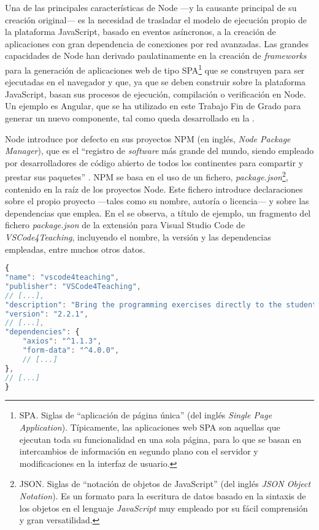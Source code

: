 Una de las principales características de Node ---y la causante principal de su creación original--- es la necesidad de trasladar el modelo de ejecución propio de la plataforma JavaScript, basado en eventos asíncronos, a la creación de aplicaciones con gran dependencia de conexiones por red avanzadas. Las grandes capacidades de Node han derivado paulatinamente en la creación de \textit{frameworks} para la generación de aplicaciones web de tipo SPA\footnote{SPA. Siglas de ``aplicación de página única'' (del inglés \textit{Single Page Application}). Típicamente, las aplicaciones web SPA son aquellas que ejecutan toda su funcionalidad en una sola página, para lo que se basan en intercambios de información en segundo plano con el servidor y modificaciones en la interfaz de usuario.} que se construyen para ser ejecutadas en el navegador y que, ya que se deben construir sobre la plataforma JavaScript, basan sus procesos de ejecución, compilación o verificación en Node. Un ejemplo es Angular, que se ha utilizado en este Trabajo Fin de Grado para generar un nuevo componente, tal como queda desarrollado en la .

Node introduce por defecto en sus proyectos NPM (en inglés, \textit{Node Package Manager}), que es el ``registro de \textit{software} más grande del mundo, siendo empleado por desarrolladores de código abierto de todos los continentes para compartir y prestar sus paquetes'' \cite{Tec_NPM}. NPM se basa en el uso de un fichero, \textit{package.json}\footnote{JSON. Siglas de ``notación de objetos de JavaScript'' (del inglés \textit{JSON Object Notation}). Es un formato para la escritura de datos basado en la sintaxis de los objetos en el lenguaje \textit{JavaScript} muy empleado por su fácil comprensión y gran versatilidad.}, contenido en la raíz de los proyectos Node. Este fichero introduce declaraciones sobre el propio proyecto ---tales como su nombre, autoría o licencia--- y sobre las dependencias que emplea.
En el  se observa, a título de ejemplo, un fragmento del fichero \textit{package.json} de la extensión para Visual Studio Code de \textit{VSCode4Teaching}, incluyendo el nombre, la versión y las dependencias empleadas, entre muchos otros datos.

\begin{lstlisting}[language=JavaScript,caption={Fragmento del \textit{package.json} de la extensión de \textit{VSCode4Teaching}.}, label=cod:fragmentoPackageJSON]
{
"name": "vscode4teaching",
"publisher": "VSCode4Teaching",
// [...],
"description": "Bring the programming exercises directly to the student's editor.",
"version": "2.2.1",
// [...],
"dependencies": {
    "axios": "^1.1.3",
    "form-data": "^4.0.0",
    // [...]
},
// [...]
}
\end{lstlisting}

